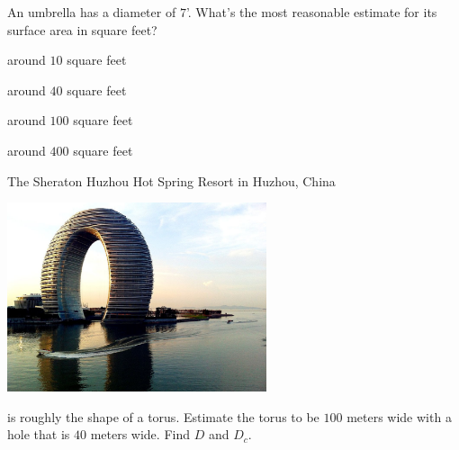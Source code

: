 \documentclass[noauthor,nooutcomes]{ximera}
\author{Bart Snapp}
\begin{document}
\maketitle


\begin{exercise}
  An umbrella has a diameter of $7$'.  What's the most reasonable
  estimate for its surface area in square feet?
  \begin{enumerate}\begin{multicols}{2}
    \item around $10$ square feet
    \item around $40$ square feet
    \item around $100$ square feet
    \item around $400$ square feet
    \end{multicols}
  \end{enumerate}
\end{exercise}



\begin{exercise}%
  The Sheraton Huzhou Hot Spring Resort in Huzhou, China
  \begin{center}
    \includegraphics[width=3in]{SheratonHuzhou.jpg}
  \end{center}  
  is roughly the shape of a torus. Estimate the torus to be $100$ meters
  wide with a hole that is $40$ meters wide. Find $D$ and $D_c$.
\end{exercise}
\end{document}
